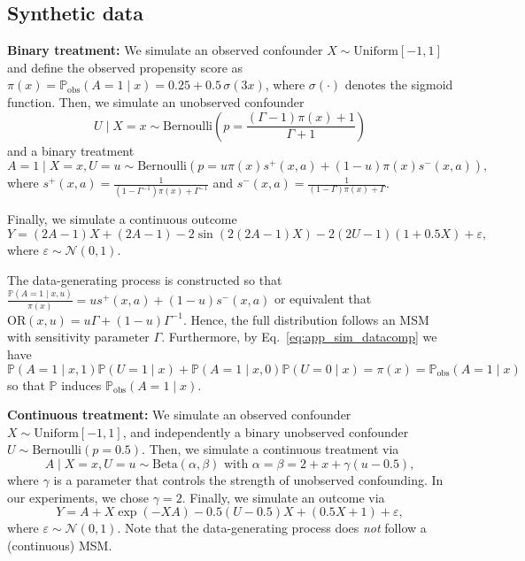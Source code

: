 \documentclass{article} %
\theoremstyle{definition}
\theoremstyle{plain}
\begin{document}
\subsection{Synthetic data}

\textbf{Binary treatment:} We simulate an observed confounder $X \sim \mathrm{Uniform}[-1, 1]$ and define the observed propensity score as $\pi(x) = \mathbb{P}_\mathrm{obs}(A=1 \mid x) = 0.25 + 0.5 \, \sigma(3x)$, where $\sigma(\cdot)$ denotes the sigmoid function. Then, we simulate an unobserved confounder
\begin{equation}\label{eq:app_sim_datacomp}
U \mid X = x \sim \textrm{Bernoulli}\left(p=\frac{(\Gamma - 1) \pi(x) + 1}{\Gamma + 1} \right) 
\end{equation}
and a binary treatment
\begin{equation}
A= 1 \mid X = x, U = u \sim \textrm{Bernoulli}\left(p=u \pi(x) s^{+}(x, a) + (1 - u) \pi(x) s^{-}(x, a) \right),
\end{equation}
where $s^{+}(x, a) = \frac{1}{(1 - \Gamma^{-1}) \pi(x) + \Gamma^{-1}}$ and $s^{-}(x, a) = \frac{1}{(1 - \Gamma) \pi(x) + \Gamma}$.

Finally, we simulate a continuous outcome 
\begin{equation}
Y = (2  A - 1) X + (2 A - 1) - 2  \sin(2  (2  A - 1)  X) - 2  (2  U - 1)  (1 + 0.5  X) + \varepsilon,
\end{equation}
where $\varepsilon \sim \mathcal{N}(0, 1)$.

The data-generating process is constructed so that $\frac{\mathbb{P}(A = 1 \mid x, u)}{\pi(x)} = u s^{+}(x, a) + (1-u)s^{-}(x, a)$ or equivalent that $\mathrm{OR}(x, u) = u \Gamma + (1 - u) \Gamma^{-1}$. Hence, the full distribution follows an MSM with sensitivity parameter $\Gamma$. Furthermore, by Eq.~\eqref{eq:app_sim_datacomp} we have 
\begin{equation}
  \mathbb{P}(A = 1 \mid x, 1) \mathbb{P}(U = 1 \mid x)  +  \mathbb{P}(A = 1 \mid x, 0)  \mathbb{P}(U = 0 \mid x) = \pi(x) = \mathbb{P}_\mathrm{obs}(A=1 \mid x)
\end{equation}
so that $\mathbb{P}$ induces $\mathbb{P}_\mathrm{obs}(A=1 \mid x)$.

\textbf{Continuous treatment:} We simulate an observed confounder $X \sim \mathrm{Uniform}[-1, 1]$, and independently a binary unobserved confounder $U \sim \textrm{Bernoulli}(p=0.5)$. Then, we simulate a continuous treatment via
\begin{equation}
     A \mid X = x, U = u \sim \mathrm{Beta}(\alpha, \beta) \text{ with } \alpha = \beta = 2 + x + \gamma (u - 0.5),
\end{equation}
where $\gamma$ is a parameter that controls the strength of unobserved confounding. In our experiments, we chose $\gamma = 2$. Finally, we simulate an outcome via
\begin{equation}
    Y = A + X  \exp(-X A) - 0.5  (U - 0.5)  X + (0.5  X + 1) + \varepsilon,
\end{equation}
where $\varepsilon \sim \mathcal{N}(0, 1)$. Note that the data-generating process does \emph{not} follow a (continuous) MSM. 
\end{document}
